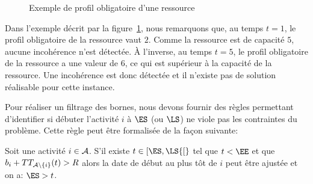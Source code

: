 \begin{ex}
  \begin{figure}[!htb]
    \centering
    \caption{Exemple de profil obligatoire d'une ressource}
    \label{fig_profil_CUSP}
  \end{figure}
  Dans l'exemple décrit par la figure~\ref{fig_profil_CUSP}, nous
  remarquons que, au temps $t=1$, le profil obligatoire de la
  ressource vaut $2$. Comme la ressource est de capacité $5$, aucune
  incohérence n'est détectée. À l'inverse, au temps $t=5$, le profil
  obligatoire de la ressource a une valeur de $6$, ce qui est
  supérieur à la capacité de la ressource. Une incohérence est donc
  détectée et il n'existe pas de solution réalisable pour cette
  instance. 
\end{ex}

Pour réaliser un filtrage des bornes, nous devons fournir des règles
permettant d'identifier si débuter l'activité $i$ à $\ES$ (ou $\LS$)
ne viole pas les contraintes du problème. Cette règle peut être
formalisée de la façon suivante: 

\begin{reg}
\label{reg:TT}
Soit une activité $i \in {\cal A}$. S'il existe $t \in [\ES,\LS{[}$ tel que
$t < \EE$ et que $b_i + TT_{{\cal A} \setminus\{i\}}(t) > R$ alors la date
de début au plus tôt de $i$ peut être ajustée et on a: $ \ES > t$.
\end{reg}

